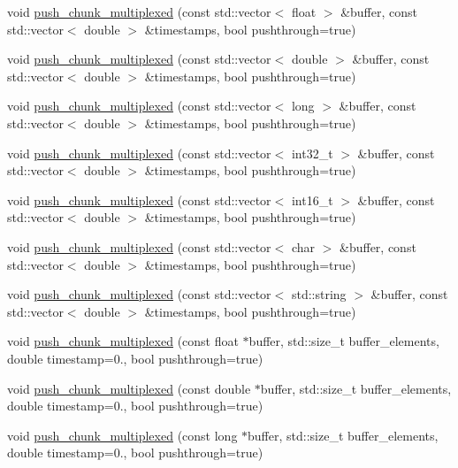 \begin{DoxyCompactItemize}
\item 
void \hyperlink{classlsl_1_1stream__outlet_a5944abd4386a9568441ddb352e8df71f}{push\+\_\+chunk\+\_\+multiplexed} (const std\+::vector$<$ float $>$ \&buffer, const std\+::vector$<$ double $>$ \&timestamps, bool pushthrough=true)
\item 
void \hyperlink{classlsl_1_1stream__outlet_ad0a2c2b78e18b423e34ed0282df6b919}{push\+\_\+chunk\+\_\+multiplexed} (const std\+::vector$<$ double $>$ \&buffer, const std\+::vector$<$ double $>$ \&timestamps, bool pushthrough=true)
\item 
void \hyperlink{classlsl_1_1stream__outlet_a9075bd46bb9f2d1a0d494dbb7772eb48}{push\+\_\+chunk\+\_\+multiplexed} (const std\+::vector$<$ long $>$ \&buffer, const std\+::vector$<$ double $>$ \&timestamps, bool pushthrough=true)
\item 
void \hyperlink{classlsl_1_1stream__outlet_ae3875c13d689e11c6d34181b8fadfa5d}{push\+\_\+chunk\+\_\+multiplexed} (const std\+::vector$<$ int32\+\_\+t $>$ \&buffer, const std\+::vector$<$ double $>$ \&timestamps, bool pushthrough=true)
\item 
void \hyperlink{classlsl_1_1stream__outlet_a9d175090070f408ca7e9c8d8437c02f6}{push\+\_\+chunk\+\_\+multiplexed} (const std\+::vector$<$ int16\+\_\+t $>$ \&buffer, const std\+::vector$<$ double $>$ \&timestamps, bool pushthrough=true)
\item 
void \hyperlink{classlsl_1_1stream__outlet_a5ceb5a7488582559846637a310056605}{push\+\_\+chunk\+\_\+multiplexed} (const std\+::vector$<$ char $>$ \&buffer, const std\+::vector$<$ double $>$ \&timestamps, bool pushthrough=true)
\item 
void \hyperlink{classlsl_1_1stream__outlet_ac31c0f13ba9de7331e520b3b08ede811}{push\+\_\+chunk\+\_\+multiplexed} (const std\+::vector$<$ std\+::string $>$ \&buffer, const std\+::vector$<$ double $>$ \&timestamps, bool pushthrough=true)
\item 
void \hyperlink{classlsl_1_1stream__outlet_a7ea80b891c9aaf7b4c62c715692218cc}{push\+\_\+chunk\+\_\+multiplexed} (const float $\ast$buffer, std\+::size\+\_\+t buffer\+\_\+elements, double timestamp=0., bool pushthrough=true)
\item 
void \hyperlink{classlsl_1_1stream__outlet_af5d993951e77df22ecb225c3b4aad87c}{push\+\_\+chunk\+\_\+multiplexed} (const double $\ast$buffer, std\+::size\+\_\+t buffer\+\_\+elements, double timestamp=0., bool pushthrough=true)
\item 
void \hyperlink{classlsl_1_1stream__outlet_a4953cee1905211d533cb9bd6b0525099}{push\+\_\+chunk\+\_\+multiplexed} (const long $\ast$buffer, std\+::size\+\_\+t buffer\+\_\+elements, double timestamp=0., bool pushthrough=true)

\end{DoxyCompactItemize}
